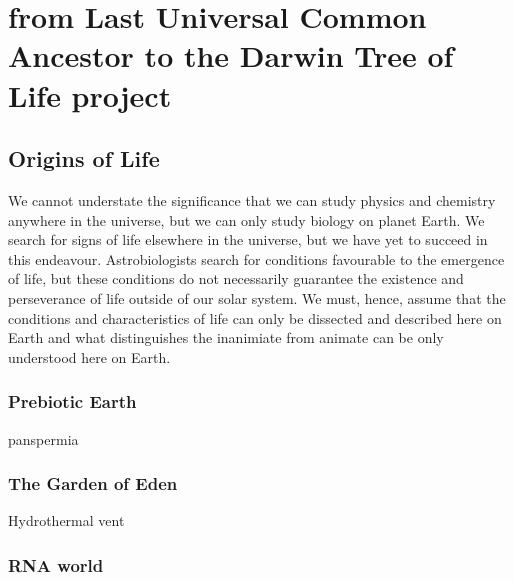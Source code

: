 
\chapter{from Last Universal Common Ancestor to the Darwin Tree of Life project}  %

\ifpdf
    \graphicspath{{Chapter1/Figs/Raster/}{Chapter1/Figs/PDF/}{Chapter1/Figs/}}
\else
    \graphicspath{{Chapter1/Figs/Vector/}{Chapter1/Figs/}}
\fi



\section{Origins of Life}

We cannot understate the significance that we can study physics and chemistry anywhere in the universe, but we can only study biology on planet Earth. We search for signs of life elsewhere in the universe, but we have yet to succeed in this endeavour. Astrobiologists search for conditions favourable to the emergence of life, but these conditions do not necessarily guarantee the existence and perseverance of life outside of our solar system. We must, hence, assume that the conditions and characteristics of life can only be dissected and described here on Earth and what distinguishes the inanimiate from animate can be only understood here on Earth. 


\subsection{Prebiotic Earth}
panspermia

\subsection{The Garden of Eden}

Hydrothermal vent

\subsection{RNA world}

